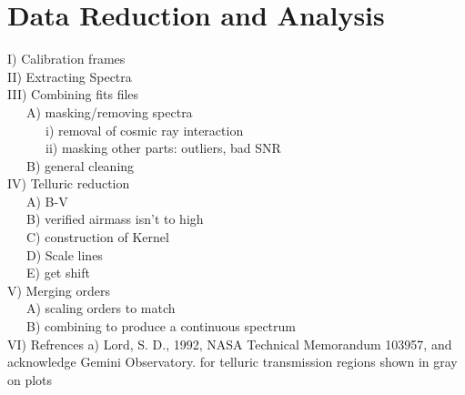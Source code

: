 \section{Data Reduction and Analysis}

I) Calibration frames\\

II) Extracting Spectra\\

III) Combining fits files\\
~~~A) masking/removing spectra\\
~~~~~~i) removal of cosmic ray interaction\\
~~~~~~ii) masking other parts: outliers, bad SNR\\
~~~B) general cleaning\\

IV) Telluric reduction\\
~~~A) B-V\\
~~~B) verified airmass isn't to high\\
~~~C) construction of Kernel\\
~~~D) Scale lines\\
~~~E) get shift\\

V) Merging orders\\
~~~A) scaling orders to match\\
~~~B) combining to produce a continuous spectrum\\

VI) Refrences
  a) Lord, S. D., 1992, NASA Technical Memorandum 103957, and acknowledge Gemini Observatory.
  for telluric transmission regions shown in gray on plots
  
  
  
  
  